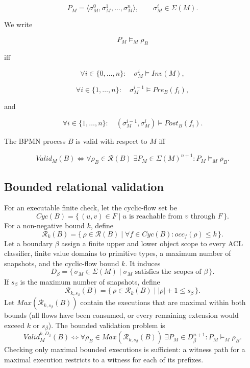 \documentclass[11pt,a4paper]{article}
\begin{document}
\[
P_M =
\langle
\sigma_M^0,
\sigma_M^1,
\ldots,
\sigma_M^n
\rangle,
\qquad
\sigma_M^i \in \Sigma(M).
\]

We write

\[
P_M \models_M \rho_B
\]

iff

\[
\forall i\in\{0,\ldots,n\}:
\quad
\sigma_M^i \models Inv(M),
\]

\[
\forall i\in\{1,\ldots,n\}:
\quad
\sigma_M^{i-1} \models \mathit{Pre}_B(f_i),
\]

and

\[
\forall i\in\{1,\ldots,n\}:
\quad
(\sigma_M^{i-1},\sigma_M^i)
\models \mathit{Post}_B(f_i).
\]

The BPMN process $B$ is valid with respect to $M$ iff

\[
Valid_M(B)
\iff
\forall \rho_B\in\mathcal{R}(B)\;
\exists P_M\in\Sigma(M)^{n+1}:
P_M\models_M\rho_B.
\tag{VALID}
\]

\subsection{Bounded relational validation}

For an executable finite check, let the cyclic-flow set be
\[
\mathit{Cyc}(B)
=
\{\,(u,v)\in F\mid u\text{ is reachable from }v\text{ through }F\,\}.
\]
For a non-negative bound $k$, define
\[
\mathcal R_k(B)
=
\{\,\rho\in\mathcal R(B)
\mid
\forall f\in\mathit{Cyc}(B):\mathit{occ}_f(\rho)\leq k\,\}.
\]
Let a boundary $\beta$ assign a finite upper and lower object scope to every
ACL classifier, finite value domains to primitive types, a maximum number of
snapshots, and the cyclic-flow bound $k$. It induces
\[
D_\beta
=
\{\,\sigma_M\in\Sigma(M)\mid\sigma_M\text{ satisfies the scopes of }\beta\,\}.
\]
If $s_\beta$ is the maximum number of snapshots, define
\[
\mathcal R_{k,s_\beta}(B)
=
\{\,\rho\in\mathcal R_k(B)\mid |\rho|+1\leq s_\beta\,\}.
\]
Let
$\mathit{Max}(\mathcal R_{k,s_\beta}(B))$ contain the executions that are
maximal within both bounds (all flows have been consumed, or every remaining
extension would exceed $k$ or $s_\beta$). The bounded validation problem is
\[
Valid_M^{k,D_\beta}(B)
\iff
\forall\rho_B\in\mathit{Max}(\mathcal R_{k,s_\beta}(B))\;
\exists P_M\in D_\beta^{n+1}:
P_M\models_M\rho_B.
\tag{BVALID}
\]
Checking only maximal bounded executions is sufficient: a witness path for a
maximal execution restricts to a witness for each of its prefixes.
\end{document}
